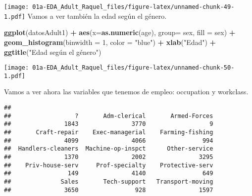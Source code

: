 \documentclass[]{article}
\newenvironment{Shaded}{\begin{snugshade}}{\end{snugshade}}
\newcommand{\DataTypeTok}[1]{\textcolor[rgb]{0.13,0.29,0.53}{#1}}
\newcommand{\DecValTok}[1]{\textcolor[rgb]{0.00,0.00,0.81}{#1}}
\newcommand{\KeywordTok}[1]{\textcolor[rgb]{0.13,0.29,0.53}{\textbf{#1}}}
\newcommand{\NormalTok}[1]{#1}
\newcommand{\OperatorTok}[1]{\textcolor[rgb]{0.81,0.36,0.00}{\textbf{#1}}}
\newcommand{\StringTok}[1]{\textcolor[rgb]{0.31,0.60,0.02}{#1}}
\begin{document}
\texttt{[image: 01a-EDA\_Adult\_Raquel\_files/figure-latex/unnamed-chunk-49-1.pdf]}
Vamos a ver también la edad según el género.

\begin{Shaded}
\begin{Highlighting}[]
\KeywordTok{ggplot}\NormalTok{(datosAdult1) }\OperatorTok{+}\StringTok{ }\KeywordTok{aes}\NormalTok{(}\DataTypeTok{x=}\KeywordTok{as.numeric}\NormalTok{(age), }\DataTypeTok{group=}\NormalTok{ sex, }\DataTypeTok{fill =}\NormalTok{ sex) }\OperatorTok{+}\StringTok{ }\KeywordTok{geom\_histogram}\NormalTok{(}\DataTypeTok{binwidth =} \DecValTok{1}\NormalTok{, }\DataTypeTok{color =} \StringTok{"blue"}\NormalTok{) }\OperatorTok{+}\StringTok{ }\KeywordTok{xlab}\NormalTok{(}\StringTok{"Edad"}\NormalTok{) }\OperatorTok{+}\StringTok{ }\KeywordTok{ggtitle}\NormalTok{(}\StringTok{"Edad según el género"}\NormalTok{)}
\end{Highlighting}
\end{Shaded}

\texttt{[image: 01a-EDA\_Adult\_Raquel\_files/figure-latex/unnamed-chunk-50-1.pdf]}

Vamos a ver ahora las variables que tenemos de empleo: occupation y
workclass.

\begin{Shaded}
\end{Shaded}

\begin{verbatim}
## 
##                  ?       Adm-clerical       Armed-Forces 
##               1843               3770                  9 
##       Craft-repair    Exec-managerial    Farming-fishing 
##               4099               4066                994 
##  Handlers-cleaners  Machine-op-inspct      Other-service 
##               1370               2002               3295 
##    Priv-house-serv     Prof-specialty    Protective-serv 
##                149               4140                649 
##              Sales       Tech-support   Transport-moving 
##               3650                928               1597
\end{verbatim}

\begin{Shaded}
\end{Shaded}
\end{document}

